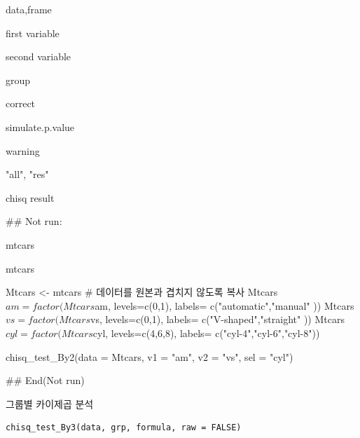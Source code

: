 \documentclass[a4paper]{book}
\begin{document}
\begin{Arguments}
\begin{ldescription}
\item[\code{data}] data,frame

\item[\code{v1}] first variable

\item[\code{v2}] second variable

\item[\code{sel}] group

\item[\code{correct}] correct

\item[\code{simulate.p.value}] simulate.p.value

\item[\code{warning}] warning

\item[\code{type}] "all", "res"
\end{ldescription}
\end{Arguments}
%
\begin{Value}
chisq result
\end{Value}
%
\begin{Examples}
\begin{ExampleCode}
## Not run: 

mtcars%

mtcars%

Mtcars <- mtcars  # 데이터를 원본과 겹치지 않도록 복사
Mtcars$am = factor(Mtcars$am, levels=c(0,1), labels= c("automatic","manual" ))
Mtcars$vs = factor(Mtcars$vs, levels=c(0,1), labels= c("V-shaped","straight" ))
Mtcars$cyl = factor(Mtcars$cyl, levels=c(4,6,8),
             labels= c("cyl-4","cyl-6","cyl-8"))

chisq_test_By2(data = Mtcars, v1 = "am", v2 = "vs", sel = "cyl")


## End(Not run)




\end{ExampleCode}
\end{Examples}
%
\begin{Description}
그룹별 카이제곱 분석
\end{Description}
%
\begin{Usage}
\begin{verbatim}
chisq_test_By3(data, grp, formula, raw = FALSE)
\end{verbatim}
\end{Usage}
\end{document}
